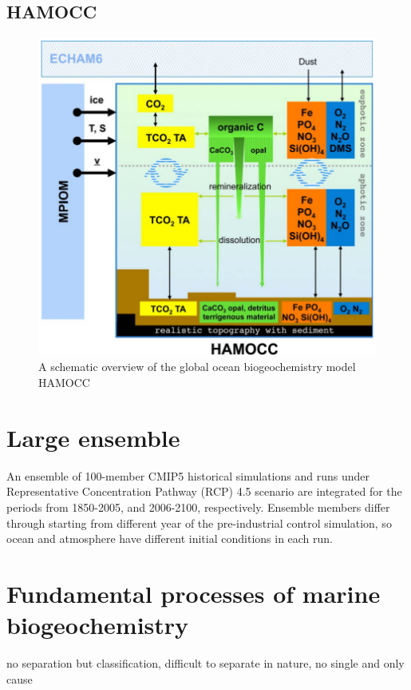 \subsection{HAMOCC}
\begin{figure}[h]
	\centering
	\includegraphics[scale=.5]{gfx/hamocc.png}
	\caption{A schematic overview of the global ocean biogeochemistry model HAMOCC \citep{Ilyina2013}}
	\label{fig:hamocc}
\end{figure}

\section{Large ensemble}
An ensemble of 100-member CMIP5 historical simulations and runs under  Representative Concentration Pathway (RCP) 4.5 scenario are integrated for the periods from 1850-2005, and 2006-2100, respectively. Ensemble members differ through starting from different year of the pre-industrial control simulation, so ocean and atmosphere have different initial conditions in each run. 
%

\section{Fundamental processes of marine biogeochemistry}
no separation but classification, difficult to separate in nature, no single and only cause
